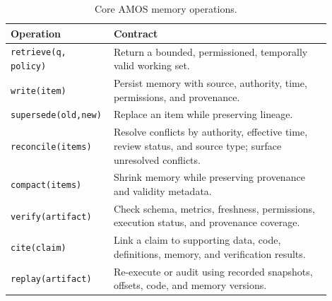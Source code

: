 \documentclass[10pt]{article}
\newcommand{\amos}{\textsc{AMOS}\xspace}
\newcommand{\code}[1]{\texttt{#1}}
\begin{document}
\begin{table}[p]
\centering
\small
\begin{tabular}{L{0.24\linewidth}L{0.66\linewidth}}
\toprule
\textbf{Operation} & \textbf{Contract} \\
\midrule
\code{retrieve(q, policy)} & Return a bounded, permissioned, temporally valid working set. \\
\code{write(item)} & Persist memory with source, authority, time, permissions, and provenance. \\
\code{supersede(old,new)} & Replace an item while preserving lineage. \\
\code{reconcile(items)} & Resolve conflicts by authority, effective time, review status, and source type; surface unresolved conflicts. \\
\code{compact(items)} & Shrink memory while preserving provenance and validity metadata. \\
\code{verify(artifact)} & Check schema, metrics, freshness, permissions, execution status, and provenance coverage. \\
\code{cite(claim)} & Link a claim to supporting data, code, definitions, memory, and verification results. \\
\code{replay(artifact)} & Re-execute or audit using recorded snapshots, offsets, code, and memory versions. \\
\bottomrule
\end{tabular}
\caption{Core \amos memory operations.}
\label{tab:ops}
\end{table}
\end{document}
